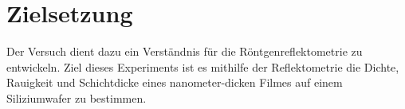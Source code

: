 \section{Zielsetzung}
\label{sec:Zielsetzung}

Der Versuch dient dazu ein Verständnis für die Röntgenreflektometrie zu entwickeln.
Ziel dieses Experiments ist es mithilfe der Reflektometrie die Dichte, Rauigkeit und Schichtdicke eines nanometer-dicken Filmes auf einem Siliziumwafer zu bestimmen. 